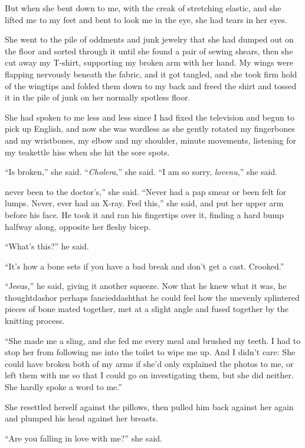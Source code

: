 But when she bent down to me, with the creak of stretching elastic,
and she lifted me to my feet and bent to look me in the eye, she had
tears in her eyes.

She went to the pile of oddments and junk jewelry that she had dumped
out on the floor and sorted through it until she found a pair of
sewing shears, then she cut away my T-shirt, supporting my broken arm
with her hand.  My wings were flapping nervously beneath the fabric,
and it got tangled, and she took firm hold of the wingtips and folded
them down to my back and freed the shirt and tossed it in the pile of
junk on her normally spotless floor.

She had spoken to me less and less since I had fixed the television
and begun to pick up English, and now she was wordless as she gently
rotated my fingerbones and my wristbones, my elbow and my shoulder,
minute movements, listening for my teakettle hiss when she hit the
sore spots.

``Is broken,'' she said.  ``\textit{Cholera},'' she said.  ``I am so
sorry, \textit{lovenu},'' she said.

never been to the doctor's,'' she said.  ``Never had a pap
smear or been felt for lumps.  Never, ever had an X-ray.  Feel this,''
she said, and put her upper arm before his face.  He took it and ran
his fingertips over it, finding a hard bump halfway along, opposite
her fleshy bicep.

``What's this?'' he said.

``It's how a bone sets if you have a bad break and don't get a cast. 
Crooked.''

``Jesus,'' he said, giving it another squeeze.  Now that he knew what
it was, he thoughtdash{}or perhaps fancieddash{}that he could feel how the
unevenly splintered pieces of bone mated together, met at a slight
angle and fused together by the knitting process.

``She made me a sling, and she fed me every meal and brushed my teeth. 
I had to stop her from following me into the toilet to wipe me up. 
And I didn't care:  She could have broken both of my arms if she'd
only explained the photos to me, or left them with me so that I could
go on investigating them, but she did neither.  She hardly spoke a
word to me.''

She resettled herself against the pillows, then pulled him back
against her again and plumped his head against her breasts.

``Are you falling in love with me?'' she said.

